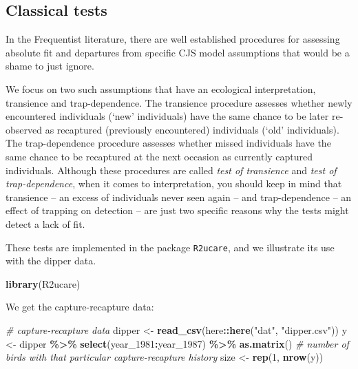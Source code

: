 \documentclass[
  12pt,
]{krantz}
\newenvironment{Shaded}{\begin{snugshade}}{\end{snugshade}}
\newcommand{\CommentTok}[1]{\textcolor[rgb]{0.56,0.35,0.01}{\textit{#1}}}
\newcommand{\DecValTok}[1]{\textcolor[rgb]{0.00,0.00,0.81}{#1}}
\newcommand{\FunctionTok}[1]{\textcolor[rgb]{0.13,0.29,0.53}{\textbf{#1}}}
\newcommand{\NormalTok}[1]{#1}
\newcommand{\OtherTok}[1]{\textcolor[rgb]{0.56,0.35,0.01}{#1}}
\newcommand{\SpecialCharTok}[1]{\textcolor[rgb]{0.81,0.36,0.00}{\textbf{#1}}}
\newcommand{\StringTok}[1]{\textcolor[rgb]{0.31,0.60,0.02}{#1}}
\begin{document}
\hypertarget{classical-tests}{%
\subsection{Classical tests}\label{classical-tests}}

In the Frequentist literature, there are well established procedures for assessing absolute fit and departures from specific CJS model assumptions that would be a shame to just ignore.

We focus on two such assumptions that have an ecological interpretation, transience and trap-dependence. The transience procedure assesses whether newly encountered individuals (`new' individuals) have the same chance to be later re-observed as recaptured (previously encountered) individuals (`old' individuals). The trap-dependence procedure assesses whether missed individuals have the same chance to be recaptured at the next occasion as currently captured individuals. Although these procedures are called \emph{test of transience} and \emph{test of trap-dependence}, when it comes to interpretation, you should keep in mind that transience -- an excess of individuals never seen again -- and trap-dependence -- an effect of trapping on detection -- are just two specific reasons why the tests might detect a lack of fit.

These tests are implemented in the package \texttt{R2ucare}, and we illustrate its use with the dipper data.

\begin{Shaded}
\begin{Highlighting}[]
\FunctionTok{library}\NormalTok{(R2ucare)}
\end{Highlighting}
\end{Shaded}

We get the capture-recapture data:

\begin{Shaded}
\begin{Highlighting}[]
\CommentTok{\# capture{-}recapture data}
\NormalTok{dipper }\OtherTok{\textless{}{-}} \FunctionTok{read\_csv}\NormalTok{(here}\SpecialCharTok{::}\FunctionTok{here}\NormalTok{(}\StringTok{"dat"}\NormalTok{, }\StringTok{"dipper.csv"}\NormalTok{))}
\NormalTok{y }\OtherTok{\textless{}{-}}\NormalTok{ dipper }\SpecialCharTok{\%\textgreater{}\%}
  \FunctionTok{select}\NormalTok{(year\_1981}\SpecialCharTok{:}\NormalTok{year\_1987) }\SpecialCharTok{\%\textgreater{}\%}
  \FunctionTok{as.matrix}\NormalTok{()}
\CommentTok{\# number of birds with that particular capture{-}recapture history}
\NormalTok{size }\OtherTok{\textless{}{-}} \FunctionTok{rep}\NormalTok{(}\DecValTok{1}\NormalTok{, }\FunctionTok{nrow}\NormalTok{(y))}
\end{Highlighting}
\end{Shaded}
\end{document}
